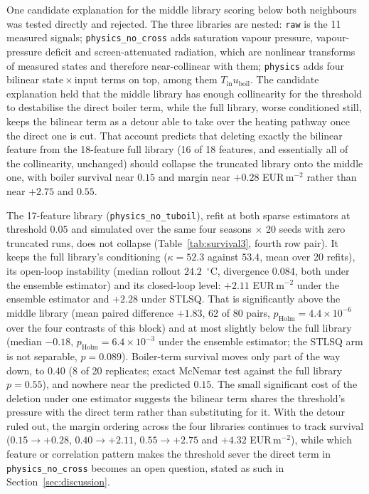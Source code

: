 One candidate explanation for the middle library scoring below both neighbours was tested
directly and rejected. The three libraries are nested:
\texttt{raw} is the 11 measured signals; \texttt{physics\_no\_cross} adds saturation
vapour pressure, vapour-pressure deficit and screen-attenuated radiation, which are
nonlinear transforms of measured states and therefore near-collinear with them;
\texttt{physics} adds four bilinear state\,$\times$\,input terms on top, among them
$T_{\text{in}}u_{\mathrm{boil}}$. The candidate explanation held that the middle library
has enough collinearity for the threshold to destabilise the direct boiler term, while the
full library, worse conditioned still, keeps the bilinear term as a detour able to take
over the heating pathway once the direct one is cut. That account predicts that deleting
exactly the bilinear feature from the 18-feature full library (16 of 18 features, and
essentially all of the collinearity, unchanged) should collapse the truncated library onto
the middle one, with boiler survival near $0.15$ and margin near $+0.28$ EUR\,m$^{-2}$
rather than near $+2.75$ and $0.55$.

The 17-feature library (\texttt{physics\_no\_tuboil}), refit at both sparse estimators at
threshold $0.05$ and simulated over the same four seasons $\times$ 20 seeds with zero
truncated runs, does not collapse (Table~\ref{tab:survival3}, fourth row pair). It keeps
the full library's conditioning ($\kappa = 52.3$ against $53.4$, mean over 20 refits), its
open-loop instability (median rollout $24.2$~$^\circ$C, divergence $0.084$, both under the
ensemble estimator) and its closed-loop level: $+2.11$ EUR\,m$^{-2}$ under the ensemble
estimator and $+2.28$ under STLSQ. That is significantly above the middle library (mean paired
difference $+1.83$, 62 of 80 pairs, $p_{\text{Holm}} = 4.4\times10^{-6}$ over the four
contrasts of this block) and at most slightly below the full library (median $-0.18$,
$p_{\text{Holm}} = 6.4\times10^{-3}$ under the ensemble estimator; the STLSQ arm is not
separable, $p = 0.089$). Boiler-term survival moves only part of the way down, to $0.40$
(8 of 20 replicates; exact McNemar test against the full library $p = 0.55$), and nowhere
near the predicted $0.15$. The small significant cost of the deletion under one estimator
suggests the bilinear term shares the threshold's pressure with the direct term rather
than substituting for it. With the detour ruled out, the margin ordering across the four
libraries continues to track survival ($0.15 \rightarrow +0.28$, $0.40 \rightarrow
+2.11$, $0.55 \rightarrow +2.75$ and $+4.32$ EUR\,m$^{-2}$), while which feature
or correlation pattern makes the threshold sever the direct term in
\texttt{physics\_no\_cross} becomes an open question, stated as such in
Section~\ref{sec:discussion}.

